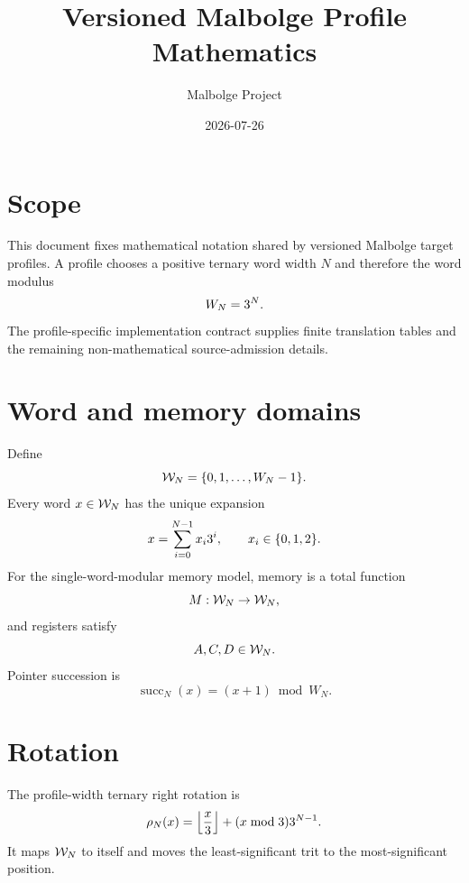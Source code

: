 \documentclass{article}
\title{Versioned Malbolge Profile Mathematics}
\author{Malbolge Project}
\date{2026-07-26}
\begin{document}
\maketitle

\section{Scope}

This document fixes mathematical notation shared by versioned Malbolge target
profiles. A profile chooses a positive ternary word width $N$ and therefore the
word modulus
\begin{equation}
  W_N = 3^{N}.
  \label{eq:profile-word-modulus}
\end{equation}
The profile-specific implementation contract supplies finite translation tables
and the remaining non-mathematical source-admission details.

\section{Word and memory domains}

Define
\begin{equation}
  \mathcal{W}_{N} = \{0,1,\ldots,W_N-1\}.
  \label{eq:profile-word-domain}
\end{equation}
Every word $x\in\mathcal{W}_{N}$ has the unique expansion
\[
  x = \sum_{i=0}^{N-1} x_i3^i,
  \qquad x_i\in\{0,1,2\}.
\]
For the single-word-modular memory model, memory is a total function
\begin{equation}
  M : \mathcal{W}_{N}\to\mathcal{W}_{N},
  \label{eq:profile-memory-domain}
\end{equation}
and registers satisfy
\[
  A,C,D\in\mathcal{W}_{N}.
\]
Pointer succession is
\begin{equation}
  \operatorname{succ}_N(x)=(x+1)\bmod W_N.
  \label{eq:profile-successor}
\end{equation}

\section{Rotation}

The profile-width ternary right rotation is
\begin{equation}
  \rho_{N}\!\left(x\right)
    = \left\lfloor\frac{x}{3}\right\rfloor
      + (x\bmod 3)3^{N-1}.
  \label{eq:profile-rotate}
\end{equation}
It maps $\mathcal{W}_{N}$ to itself and moves the least-significant trit to the
most-significant position.
\end{document}
